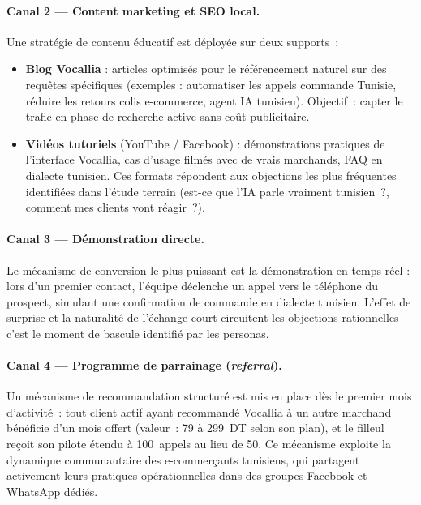 \paragraph{Canal 2 --- Content marketing et SEO local.}
Une stratégie de contenu éducatif est déployée sur deux supports~:
\begin{itemize}
    \item \textbf{Blog Vocallia} : articles optimisés pour le référencement
    naturel sur des requêtes spécifiques (exemples : \og{}automatiser les appels
    commande Tunisie\fg{}, \og{}réduire les retours colis e-commerce\fg{}, \og{}agent IA
    tunisien\fg{}). Objectif~: capter le trafic en phase de recherche active sans
    coût publicitaire.
    \item \textbf{Vidéos tutoriels} (YouTube / Facebook) : démonstrations
    pratiques de l'interface Vocallia, cas d'usage filmés avec de vrais marchands,
    FAQ en dialecte tunisien. Ces formats répondent aux objections les plus
    fréquentes identifiées dans l'étude terrain (\og{}est-ce que l'IA parle vraiment
    tunisien~?\fg{}, \og{}comment mes clients vont réagir~?\fg{}).
\end{itemize}

\paragraph{Canal 3 --- Démonstration directe.}
Le mécanisme de conversion le plus puissant est la démonstration en temps réel :
lors d'un premier contact, l'équipe déclenche un appel vers le téléphone du
prospect, simulant une confirmation de commande en dialecte tunisien. L'effet
de surprise et la naturalité de l'échange court-circuitent les objections
rationnelles --- c'est le moment de bascule identifié par les personas.

\paragraph{Canal 4 --- Programme de parrainage (\textit{referral}).}
Un mécanisme de recommandation structuré est mis en place dès le premier mois
d'activité~: tout client actif ayant recommandé Vocallia à un autre marchand
bénéficie d'un mois offert (valeur~: 79 à 299~DT selon son plan), et le filleul
reçoit son pilote étendu à 100~appels au lieu de 50. Ce mécanisme exploite la
dynamique communautaire des e-commerçants tunisiens, qui partagent activement
leurs pratiques opérationnelles dans des groupes Facebook et WhatsApp dédiés.

